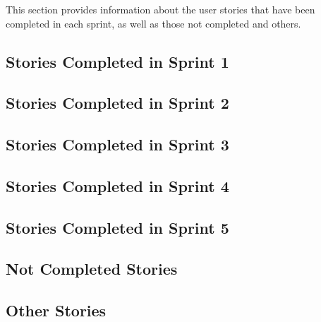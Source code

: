 This section provides information about the user stories that have been completed in each sprint, as well as those not completed and others.

\subsection{Stories Completed in Sprint 1}


\subsection{Stories Completed in Sprint 2}


\subsection{Stories Completed in Sprint 3}


\subsection{Stories Completed in Sprint 4}


\subsection{Stories Completed in Sprint 5}


\subsection{Not Completed Stories}


\subsection{Other Stories}

